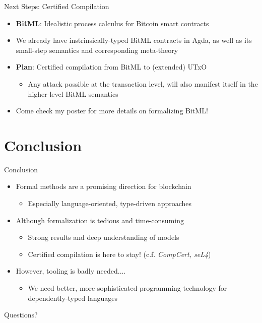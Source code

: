 \documentclass[aspectratio=43]{beamer}
\begin{document}
\begin{frame}{Next Steps: Certified Compilation}
\begin{itemize}
\item \textbf{BitML}: Idealistic process calculus for Bitcoin smart contracts
\item We already have instrinsically-typed BitML contracts in Agda,
as well as its small-step semantics and corresponding meta-theory
\item \textbf{Plan}: Certified compilation from BitML to (extended) UTxO
  \begin{itemize}
  \item Any attack possible at the transaction level,
     will also manifest itself in the higher-level BitML semantics
  \end{itemize}
\item Come check my poster for more details on formalizing BitML!
\end{itemize}
\end{frame}

\section{Conclusion}
\begin{frame}{Conclusion}
\begin{itemize}
\item Formal methods are a promising direction for blockchain
  \begin{itemize}
  \item Especially language-oriented, type-driven approaches
  \end{itemize}
\item Although formalization is tedious and time-consuming
  \begin{itemize}
  \item Strong results and deep understanding of models
  \item Certified compilation is here to stay! (c.f. \textit{CompCert, seL4})
  \end{itemize}
\item However, tooling is badly needed....
  \begin{itemize}
  \item We need better, more sophisticated programming technology
    for dependently-typed languages
  \end{itemize}
\end{itemize}
\end{frame}

\begin{frame}[standout]
  Questions?
\end{frame}
\end{document}
